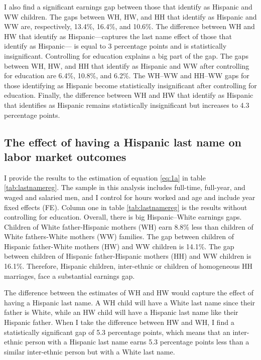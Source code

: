 \documentclass[12pt, fullpage]{article}
\begin{document}
I also find a significant earnings gap between those that identify as Hispanic and WW children. The gaps between WH, HW, and HH that identify as Hispanic and WW are, respectively, 13.4\%, 16.4\%, and 10.6\%. The difference between WH and HW that identify as Hispanic---captures the last name effect of those that identify as Hispanic--- is equal to 3 percentage points and is statistically insignificant. Controlling for education explains a big part of the gap. The gaps between WH, HW, and HH that identify as Hispanic and WW after controlling for education are 6.4\%, 10.8\%, and 6.2\%. The WH--WW and HH--WW gaps for those identifying as Hispanic become statistically insignificant after controlling for education. Finally, the difference between WH and HW that identify as Hispanic that identifies as Hispanic remains statistically insignificant but increases to 4.3 percentage points.

\subsection{The effect of having a Hispanic last name on labor market outcomes}

I provide the results to the estimation of equation \ref{eq:1a} in table \ref{tab:lastnamereg}. The sample in this analysis includes full-time, full-year, and waged and salaried men, and I control for hours worked and age and include year fixed effects (FE). Column one in table \ref{tab:lastnamereg} is the results without controlling for education. Overall, there is big Hispanic--White earnings gaps. Children of White father-Hispanic mothers (WH) earn 8.8\% less than children of White fathers-White mothers (WW) families. The gap between children of Hispanic father-White mothers (HW) and WW children is 14.1\%. The gap between children of Hispanic father-Hispanic mothers (HH) and WW children is 16.1\%. Therefore, Hispanic children, inter-ethnic or children of homogeneous HH marriages, face a substantial earnings gap.

The difference between the estimates of WH and HW would capture the effect of having a Hispanic last name. A WH child will have a White last name since their father is White, while an HW child will have a Hispanic last name like their Hispanic father. When I take the difference between HW and WH, I find a statistically significant gap of 5.3 percentage points, which means that an inter-ethnic person with a Hispanic last name earns 5.3 percentage points less than a similar inter-ethnic person but with a White last name.
\end{document}
